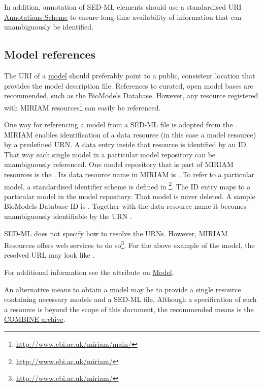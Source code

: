In addition, annotation of SED-ML elements should use a standardised URI \hyperref[sec:annotations]{Annotations Scheme} to ensure long-time availability of information that can unambiguously be identified.


\subsection{Model references}
\label{sec:modelURI}
The URI of a \hyperref[class:model]{model} should preferably point to a public, consistent location that provides the model description file. References to curated, open model bases are recommended, such as the BioModels Database. However, any resource registered with MIRIAM resources\footnote{\url{http://www.ebi.ac.uk/miriam/main/}} can easily be referenced.

One way for referencing a model from a SED-ML file is adopted from the . MIRIAM enables identification of a data resource (in this case a model resource) by a predefined URN. A data entry inside that resource is identified by an ID. That way each single  model in a particular model repository can be unambiguously referenced. One model repository that is part of MIRIAM resources is the  \citep{LDR+10}. Its data resource name in MIRIAM is . To refer to a particular model, a standardised identifier scheme is defined in \footnote{\url{http://www.ebi.ac.uk/miriam/}}. The ID entry maps to a particular model in the model repository. That model is never deleted. A sample BioModels Database ID is . Together with the data resource name it becomes unambiguously identifiable by the URN . 

SED-ML does not specify how to resolve the URNs. However, MIRIAM Resources offers web services to do so\footnote{\url{http://www.ebi.ac.uk/miriam/}}. For the above example of the  model, the resolved URL may look like .

For additional information see the \hyperref[sec:model_source]{} attribute on \hyperref[class:model]{Model}.

An alternative means to obtain a model may be to provide a single resource containing necessary models and a SED-ML file. Although a specification of such a resource is beyond the scope of this document, the recommended means is the \hyperref[sec:archive]{COMBINE archive}.


